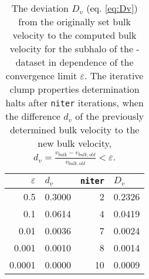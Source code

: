 \begin{table}[!htb]
	\begin{centering}
		\begin{tabular}[t]{|r | l | r | l |}
			\hline
			$\varepsilon$     &       $d_v$ 	& \texttt{niter}  		&	$D_v$	\\
			\hline
			0.5       &        0.3000  	&  		 		2    	&	0.2326  \\
			0.1       &        0.0614  	&           	4    	&	0.0419	\\
			0.01      &        0.0036  	&           	7    	&	0.0024	\\
			0.001     &        0.0010  	&           	8    	&	0.0014  \\       
			0.0001    &        0.0000  	&          		10    	&	0.0009 	\\
			\hline
		\end{tabular}
	\caption{%
			The deviation $D_v$ (eq. \ref{eq:Dv}) from the originally set bulk velocity to the computed bulk velocity for the subhalo of the \dt-dataset in dependence of the convergence limit $\varepsilon$.
			The iterative clump properties determination halts after \texttt{niter} iterations, when the difference $d_v$ of the previously determined bulk velocity to the new bulk velocity, $d_v = \frac{v_{bulk} - v_{bulk,old}}{v_{bulk,old}} < \varepsilon$.
	}
	\label{tab:converging}%
	\end{centering}
\end{table}
